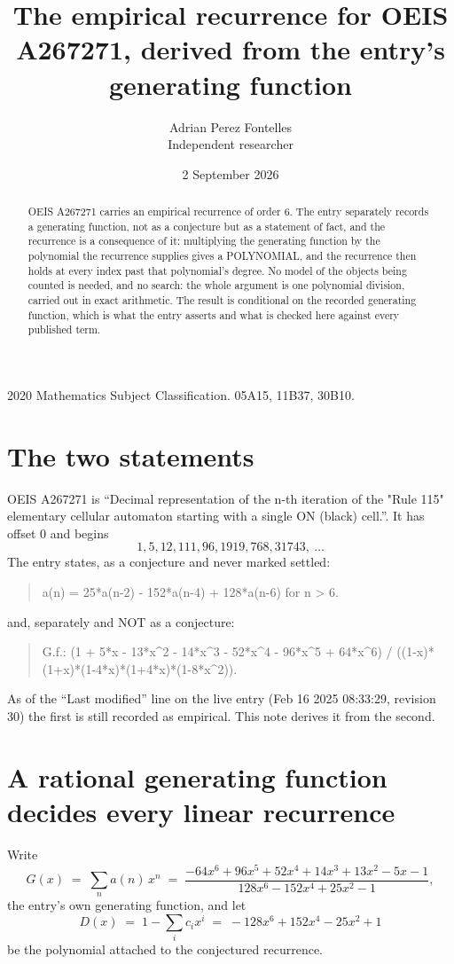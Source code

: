 \documentclass[11pt,a4paper]{article}
\title{The empirical recurrence for OEIS A267271, derived from the entry's generating function}
\author{Adrian Perez Fontelles\\ \small Independent researcher}
\date{2 September 2026}
\theoremstyle{plain}
\theoremstyle{definition}
\begin{document}
\maketitle

\begin{abstract}
OEIS A267271 carries an empirical recurrence of order $6$. The entry separately records a
generating function, not as a conjecture but as a statement of fact, and the recurrence is a
consequence of it: multiplying the generating function by the polynomial the recurrence
supplies gives a POLYNOMIAL, and the recurrence then holds at every index past that
polynomial's degree. No model of the objects being counted is needed, and no search: the
whole argument is one polynomial division, carried out in exact arithmetic. The result is
conditional on the recorded generating function, which is what the entry asserts and what is
checked here against every published term.
\end{abstract}

\noindent\small 2020 Mathematics Subject Classification. 05A15, 11B37, 30B10.\normalsize

\section{The two statements}

OEIS A267271 is ``Decimal representation of the n-th iteration of the "Rule 115" elementary cellular automaton starting with a single ON (black) cell.''. It has offset $0$ and begins
\[
1, 5, 12, 111, 96, 1919, 768, 31743,\ \dots
\]
The entry states, as a conjecture and never marked settled:
\begin{quote}
a(n) = 25*a(n-2) - 152*a(n-4) + 128*a(n-6) for n > 6.
\end{quote}
and, separately and NOT as a conjecture:
\begin{quote}
G.f.: (1 + 5*x - 13*x\^{}2 - 14*x\^{}3 - 52*x\^{}4 - 96*x\^{}5 + 64*x\^{}6) / ((1-x)*(1+x)*(1-4*x)*(1+4*x)*(1-8*x\^{}2)).
\end{quote}
As of the ``Last modified'' line on the live entry (Feb 16 2025 08:33:29, revision 30) the first is still
recorded as empirical. This note derives it from the second.

\section{A rational generating function decides every linear recurrence}

Write
\[
G(x)\;=\;\sum_{n}a(n)\,x^{n}\;=\;\frac{- 64 x^{6} + 96 x^{5} + 52 x^{4} + 14 x^{3} + 13 x^{2} - 5 x - 1}{128 x^{6} - 152 x^{4} + 25 x^{2} - 1},
\]
the entry's own generating function, and let
\[
D(x)\;=\;1-\sum_i c_i x^{i}\;=\;- 128 x^{6} + 152 x^{4} - 25 x^{2} + 1
\]
be the polynomial attached to the conjectured recurrence.
\end{document}
